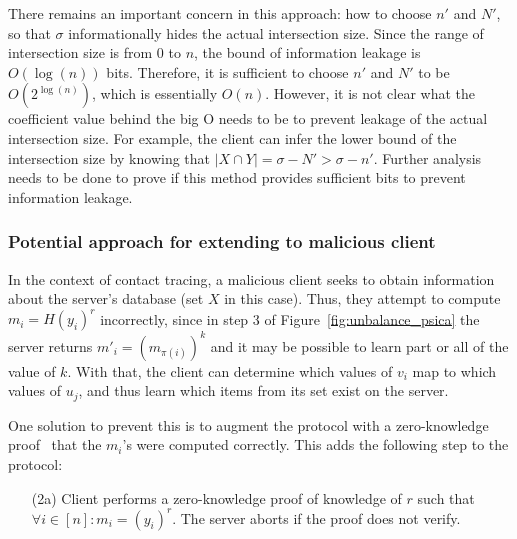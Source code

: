 \documentclass[11pt]{article} %
\newcommand{\figureref}[1]{Figure~\ref{#1}}
\newcommand{\tpsi}{$t$-PSI\xspace}
\newcommand{\psica}{PSI-CA\xspace}
\begin{document}
{	
	There remains an important concern in this approach: how to choose $n'$ and $N'$, so that $\sigma$ informationally hides the actual intersection size. Since the range of intersection size is from $0$ to $n$, the bound of information leakage is $O(\log(n))$ bits. Therefore, it is sufficient to choose $n'$ and $N'$ to be  $O(2^{\log(n)})$, which is essentially $O(n)$. However, it is not clear what the coefficient value behind the big O needs to be to prevent leakage of the actual intersection size. For example, the client can infer the lower bound of the intersection size by knowing that  $|X \cap Y| = \sigma - N' > \sigma - n'$. Further analysis needs to be done to prove if this method provides sufficient bits to prevent information leakage. %
	
	
	\subsubsection{Potential approach for extending to malicious client}
	\label{subs:malicious_user}
	
	In the context of contact tracing, a malicious client seeks to obtain information about the server's database (set $X$ in this case). Thus, they attempt to compute $m_i = H(y_i)^r$ incorrectly, since in step 3 of \figureref{fig:unbalance_psica} the server returns $m'_i=(m_{\pi(i)})^k$ and it may be possible to learn part or all of the value of $k$. With that, the client can determine which values of $v_i$ map to which values of $u_j$, and thus learn which items from its set exist on the server.
	
	One solution to prevent this is to augment the protocol with a zero-knowledge proof~\cite{SCN:JarLiu10,AC:DeCKimTsu10} that the $m_i$'s were computed correctly.
	This adds the following step to the protocol:
	\begin{itemize}
		\item[(2a)] Client performs a zero-knowledge proof of knowledge of $r$ such that $\forall i \in [n]: m_i = (y_i)^r$. The server aborts if the proof does not verify.
	\end{itemize}
	
}
\end{document}
